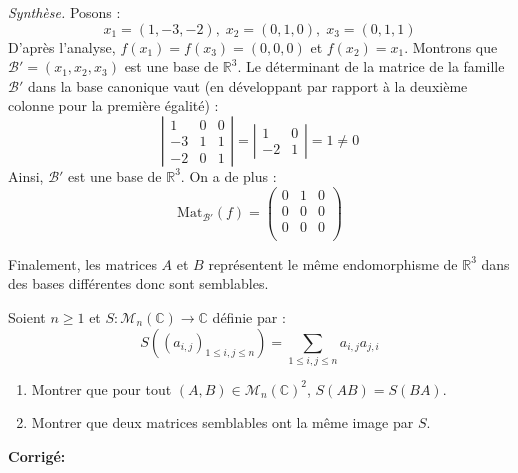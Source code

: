 \documentclass[a4paper,twoside,french,11pt]{VcCours}
\newcommand{\corr}{\textbf{Corrigé:}}
\begin{document}
\noindent \textit{Synthèse.} Posons :
$$ x_1 =(1,-3,-2), \; x_2 = (0,1,0), \; x_3= (0,1,1)$$
D'après l'analyse, $f(x_1)=f(x_3)=(0,0,0)$ et $f(x_2)=x_1$. Montrons que $\mathcal{B}'=(x_1,x_2,x_3)$ est une base de $\mathbb{R}^3$. Le déterminant de la matrice de la famille $\mathcal{B}'$ dans la base canonique vaut (en développant par rapport à la deuxième colonne pour la première égalité) :
$$ \left\vert \begin{array}{ccc}
1 & 0 & 0 \\
-3 & 1 & 1 \\
-2 & 0 & 1 
\end{array}\right\vert =  \left\vert \begin{array}{cc} 1 & 0 \\
-2 & 1\end{array}\right\vert =1 \neq 0 $$
Ainsi, $\mathcal{B}'$ est une base de $\mathbb{R}^3$. On a de plus :
$$ \textrm{Mat}_{\mathcal{B}'}(f) = \begin{pmatrix}
0 & 1 & 0 \\
0 & 0 & 0 \\
0 & 0 & 0 \\
\end{pmatrix}$$



\noindent Finalement, les matrices $A$ et $B$ représentent le même endomorphisme de $\mathbb{R}^3$ dans des bases différentes donc sont semblables.




\begin{Exercice}{} Soient $n \geq 1$ et $S : \mathcal{M}_n(\mathbb{C}) \rightarrow \mathbb{C}$ définie par :
$$ S((a_{i,j})_{1 \leq i,j \leq n}) = \sum_{1 \leq i,j \leq n} a_{i,j} a_{j,i}$$

\begin{enumerate}
\item Montrer que pour tout $(A,B) \in \mathcal{M}_n(\mathbb{C})^2$, $S(AB)=S(BA)$.
\item Montrer que deux matrices semblables ont la même image par $S$.
\end{enumerate}
\end{Exercice}

\corr 
\end{document}
